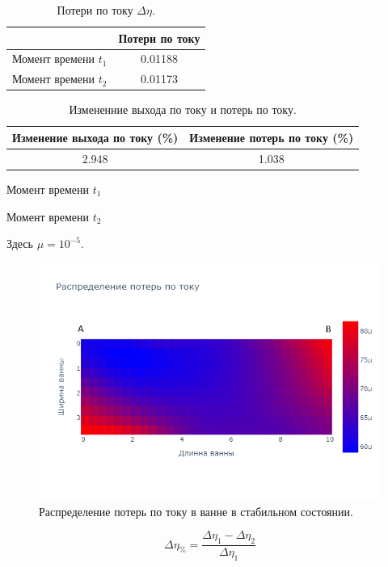 \documentclass{article}
\begin{document}
\begin{table}[ht]
\centering
\begin{tabular}{|c|c|}
\hline
			&Потери по току	\\
\hline
Момент времени $t_1$	&0.01188\\  
Момент времени $t_2$	&0.01173\\  
\hline
\end{tabular}
\caption{Потери по току $\Delta \eta$.}
\end{table}

\begin{table}[ht]
\centering
\begin{tabular}{|c|c|}
\hline
Изменение выхода по току (\%)	& Изменение потерь по току (\%) \\
\hline
2.948 & 1.038\\ 
\hline
\end{tabular}
\caption{Измененние выхода по току и потерь по току.}
\end{table}

Момент времени $t_1$

Момент времени $t_2$

Здесь $\mu = 10^{-5}$.

\begin{figure}[H]
\hspace*{-5cm}\includegraphics[width=200mm]{hloss.png}
\caption{Распределение потерь по току в ванне в стабильном состоянии.\label{fig:raspStab}}
\end{figure}

\begin{equation}
\Delta \eta_{\%} = \frac{\Delta \eta_1 - \Delta \eta_2}{\Delta \eta_1}
\end{equation}
\end{document}
